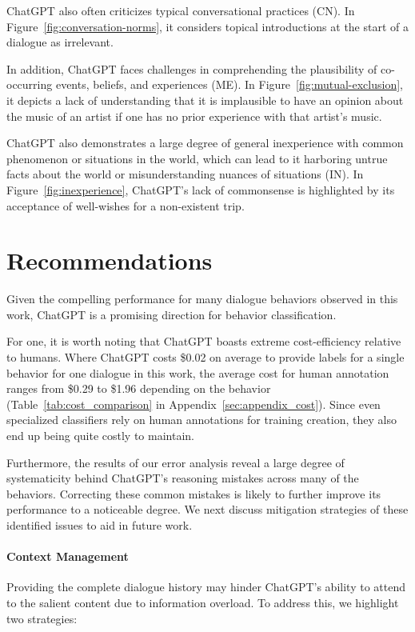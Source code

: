  ChatGPT also often criticizes typical conversational practices ({CN}). In Figure~\ref{fig:conversation-norms}, it considers topical introductions at the start of a dialogue as irrelevant.

 In addition, ChatGPT faces challenges in comprehending the plausibility of co-occurring events, beliefs, and experiences ({ME}). In Figure~\ref{fig:mutual-exclusion}, it depicts a lack of understanding that it is implausible to have an opinion about the music of an artist if one has no prior experience with that artist's music.

ChatGPT also demonstrates a large degree of general inexperience with common phenomenon or situations in the world, which can lead to it harboring untrue facts about the world or misunderstanding nuances of situations ({IN}). In Figure~\ref{fig:inexperience}, ChatGPT's lack of commonsense is highlighted by its acceptance of well-wishes for a non-existent trip.

\section{Recommendations}
\label{sec:recommendations}

Given the compelling performance for many dialogue behaviors observed in this work, ChatGPT is a promising direction for behavior classification.

For one, it is worth noting that ChatGPT boasts extreme cost-efficiency relative to humans. Where ChatGPT costs \$0.02 on average to provide labels for a single behavior for one dialogue in this work, the average cost for human annotation ranges from \$0.29 to \$1.96 depending on the behavior (Table~\ref{tab:cost_comparison} in Appendix~\ref{sec:appendix_cost}). Since even specialized classifiers rely on human annotations for training creation, they also end up being quite costly to maintain. 

Furthermore, the results of our error analysis reveal a large degree of systematicity behind ChatGPT's reasoning mistakes across many of the behaviors. Correcting these common mistakes is likely to further improve its performance to a noticeable degree. We next discuss mitigation strategies of these identified issues to aid in future work.

\paragraph{Context Management} Providing the complete dialogue history may hinder ChatGPT's ability to attend to the salient content due to information overload. To address this, we highlight two strategies:

